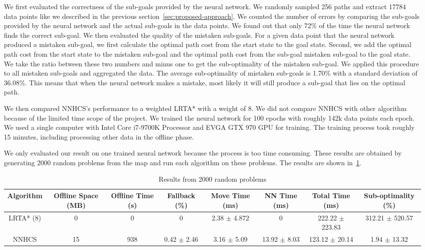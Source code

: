 \documentclass[letterpaper]{article}
\numberwithin{equation}{section}
\numberwithin{theorem}{section}
\numberwithin{lemma}{section}
\numberwithin{df}{section}
\begin{document}
    We first evaluated the correctness of the sub-goals provided by the neural network.
    We randomly sampled 256 paths and extract 17784 data points like we described in the previous section~\ref{sec:proposed-approach}.
    We counted the number of errors by comparing the sub-goals provided by the neural network and the actual sub-goals in the data points.
    We found out that only 72\% of the time the neural network finds the correct sub-goal.
    We then evaluated the quality of the mistaken sub-goals.
    For a given data point that the neural network produced a mistaken sub-goal, we first calculate the optimal path cost from the start state to the goal state.
    Second, we add the optimal path cost from the start state to the mistaken sub-goal and the optimal path cost from the sub-goal mistaken sub-goal to the goal state.
    We take the ratio between these two numbers and minus one to get the sub-optimality of the mistaken sub-goal.
    We applied this procedure to all mistaken sub-goals and aggregated the data.
    The average sub-optimality of mistaken sub-goals is 1.70\% with a standard deviation of 36.08\%.
    This means that when the neural network makes a mistake, most likely it will still produce a sub-goal that lies on the optimal path.

    We then compared NNHCS's performance to a weighted LRTA* with a weight of 8.
    We did not compare NNHCS with other algorithm because of the limited time scope of the project.
    We trained the neural network for 100 epochs with roughly 142k data points each epoch.
    We used a single computer with Intel Core i7-9700K Processor and EVGA GTX 970 GPU for training.
    The training process took roughly 15 minutes, including processing other data in the offline phase.

    We only evaluated our result on one trained neural network because the process is too time consuming.
    These results are obtained by generating 2000 random problems from the map and run each algorithm on these problems.
    The results are shown in~\ref{tab:table}.

    \begin{table}
        \label{tab:table}
        \scriptsize
        \begin{tabular}{|c|c|c|c|c|c|c|c|}
            \hline
            Algorithm & Offline Space (MB) & Offline Time (s) & Fallback (\%) & Move Time (ms) & NN Time (ms) & Total Time (ms) & Sub-optimality (\%) \\
            \hline
            LRTA* (8) & 0 & 0 & 0 & 2.38 $\pm$ 4.872 & 0 & 222.22 $\pm$ 223.83 & 312.21 $\pm$ 520.57 \\
            \hline
            NNHCS & 15 & 938 & 0.42 $\pm$ 2.46 & 3.16 $\pm$ 5.09 & 13.92 $\pm$ 8.03 & 123.12 $\pm$ 20.14 & 1.94 $\pm$ 13.32 \\
            \hline
        \end{tabular}
        \caption{\small Results from 2000 random problems}
    \end{table}
\end{document}

